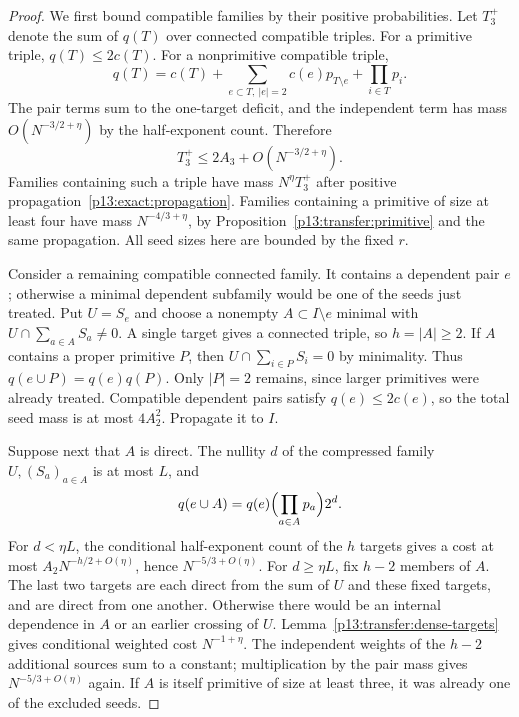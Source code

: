 \begin{proof}
We first bound compatible families by their positive probabilities.
Let $T_3^+$ denote the sum of $q(T)$ over connected compatible triples.
For a primitive triple, $q(T)\leq2c(T)$. For a nonprimitive compatible
triple,
\[
 q(T)=c(T)+\sum_{e\subset T,\ |e|=2}c(e)p_{T\setminus e}
                         +\prod_{i\in T}p_i.
\]
The pair terms sum to the one-target deficit, and the independent term
has mass $O(N^{-3/2+\eta})$ by the half-exponent count. Therefore
\begin{equation}
 T_3^+\leq2A_3+O(N^{-3/2+\eta}).
 \label{p13:transfer:positive-triples}
\end{equation}
Families containing such a triple have mass $N^\eta T_3^+$ after
positive propagation~\eqref{p13:exact:propagation}.
Families containing a primitive of size at least four have mass
$N^{-4/3+\eta}$, by Proposition~\ref{p13:transfer:primitive} and the
same propagation. All seed sizes here are bounded by the fixed $r$.

Consider a remaining compatible connected family. It contains a
dependent pair $e$; otherwise a minimal dependent subfamily would be
one of the seeds just treated. Put $U=S_e$ and choose a nonempty
$A\subset I\setminus e$ minimal with
$U\cap\sum_{a\in A}S_a\ne0$. A single target gives a connected triple,
so $h=|A|\geq2$. If $A$ contains a proper primitive $P$, then
$U\cap\sum_{i\in P}S_i=0$ by minimality. Thus
$q(e\cup P)=q(e)q(P)$. Only $|P|=2$ remains, since larger primitives
were already treated. Compatible dependent pairs satisfy $q(e)\leq2c(e)$,
so the total seed mass is at most $4A_2^2$.
Propagate it to $I$.

Suppose next that $A$ is direct. The nullity $d$ of the compressed
family $U,(S_a)_{a\in A}$ is at most $L$, and
\[
 q(e\cup A)=q(e)\Bigl(\prod_{a\in A}p_a\Bigr)2^d.
\]
For $d<\eta L$, the conditional half-exponent count of the $h$ targets
gives a cost at most $A_2N^{-h/2+O(\eta)}$, hence
$N^{-5/3+O(\eta)}$. For $d\geq\eta L$, fix $h-2$ members of $A$.
The last two targets are each direct from the sum of $U$ and these
fixed targets, and are direct from one another. Otherwise there would
be an internal dependence in $A$ or an earlier crossing of $U$.
Lemma~\ref{p13:transfer:dense-targets} gives conditional weighted cost
$N^{-1+\eta}$. The independent weights of the $h-2$ additional sources
sum to a constant; multiplication by the pair mass gives
$N^{-5/3+O(\eta)}$ again. If $A$ is itself primitive of size at least
three, it was already one of the excluded seeds.


\end{proof}
